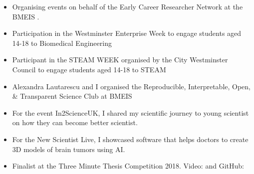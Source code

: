 \documentclass{mycv}
\begin{document}
\begin{itemize}
\item Organising events on behalf of the Early Career Researcher Network at the BMEIS .
\item Participation in the Westminster Enterprise Week to engage students aged 14-18 to Biomedical Engineering 
\item Participant in the STEAM WEEK organised by the City Westminster Council to engage students aged 14-18 to STEAM \href{https://twitter.com/_mxochicale/status/1374407825607200769}{\faTwitter} 
\item Alexandra Lautarescu and I organised the Reproducible, Interpretable, Open, \& Transparent Science Club at BMEIS 
\item For the event In2ScienceUK, I shared my scientific journey to young scientist on how they can become better scientist.  
\item For the New Scientist Live, I showcased software that helps doctors to create 3D models of brain tumors using AI. 


\item  Finalist at the Three Minute Thesis Competition 2018. Video: \href{https://www.youtube.com/watch?v=07ewRYcS-0g}{\faYoutube} and 
GitHub: \href{https://github.com/mxochicale/3mt}{\faGithubAlt} 


\end{itemize}
\end{document}
